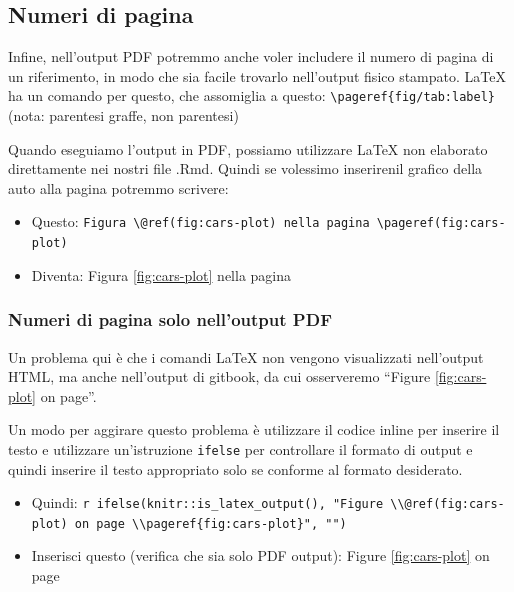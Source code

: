 \documentclass[a4paper, 11pt, nobind]{templates/ociamthesis}
\providecommand{\tightlist}{%
  \setlength{\itemsep}{0pt}\setlength{\parskip}{0pt}}
\begin{document}
\hypertarget{numeri-di-pagina}{%
\subsection{Numeri di pagina}\label{numeri-di-pagina}}

Infine, nell'output PDF potremmo anche voler includere il numero di pagina di un riferimento, in modo che sia facile trovarlo nell'output fisico stampato.
LaTeX ha un comando per questo, che assomiglia a questo: \texttt{\textbackslash{}pageref\{fig/tab:label\}} (nota: parentesi graffe, non parentesi)

Quando eseguiamo l'output in PDF, possiamo utilizzare LaTeX non elaborato direttamente nei nostri file .Rmd. Quindi se volessimo inserirenil grafico della auto alla pagina potremmo scrivere:

\begin{itemize}
\tightlist
\item
  Questo: \texttt{Figura\ \textbackslash{}@ref(fig:cars-plot)\ nella\ pagina\ \textbackslash{}pageref(fig:cars-plot)}
\item
  Diventa: Figura \ref{fig:cars-plot} nella pagina \pageref{fig:cars-plot}
\end{itemize}

\hypertarget{numeri-di-pagina-solo-nelloutput-pdf}{%
\subsubsection{Numeri di pagina solo nell'output PDF}\label{numeri-di-pagina-solo-nelloutput-pdf}}

Un problema qui è che i comandi LaTeX non vengono visualizzati nell'output HTML, ma anche nell'output di gitbook, da cui osserveremo ``Figure \ref{fig:cars-plot} on page''.

Un modo per aggirare questo problema è utilizzare il codice inline per inserire il testo e utilizzare un'istruzione \texttt{ifelse} per controllare il formato di output e quindi inserire il testo appropriato solo se conforme al formato desiderato.

\begin{itemize}
\tightlist
\item
  Quindi: \texttt{\textasciigrave{}r\ ifelse(knitr::is\_latex\_output(),\ "Figure\ \textbackslash{}\textbackslash{}@ref(fig:cars-plot)\ on\ page\ \textbackslash{}\textbackslash{}pageref\{fig:cars-plot\}",\ "")\textasciigrave{}}
\item
  Inserisci questo (verifica che sia solo PDF output): Figure \ref{fig:cars-plot} on page \pageref{fig:cars-plot}
\end{itemize}
\end{document}
